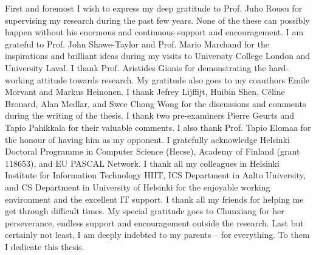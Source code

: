 

\begin{preface}[Espoo]

%
First and foremost I wish to express my deep gratitude to Prof. Juho Rousu for supervising my research during the past few years.
None of the these can possibly happen without his enormous and continuous support and encouragement.
%
I am grateful to Prof. John Shawe-Taylor and Prof. Mario Marchand for the inspirations and brilliant ideas during my visits to University College London and University Laval.
%
I thank Prof. Aristides Gionis for demonstrating the hard-working attitude towards research.
My gratitude also goes to my coauthors Emile Morvant and Markus Heinonen. 
%
I thank Jefrey Lijffijt, Huibin Shen, C\'eline Brouard, Alan Medlar, and Swee Chong Wong for the discussions and comments during the writing of the thesis.
I thank two pre-examiners Pierre Geurts and Tapio Pahikkala for their valuable comments.
I also thank Prof. Tapio Elomaa for the honour of having him as my opponent.
%
I gratefully acknowledge Helsinki Doctoral Programme in Computer Science (Hecse), Academy of Finland (grant 118653), and EU PASCAL Network.
% 
I thank all my colleagues in Helsinki Institute for Information Technology HIIT, ICS Department in Aalto University, and CS Department in University of Helsinki for the enjoyable working environment and the excellent IT support.
%
I thank all my friends for helping me get through difficult times.
%
My special gratitude goes to Chunxiang for her perseverance, endless support and encouragement outside the research.
Last but certainly not least, I am deeply indebted to my parents -- for everything. To them I dedicate this thesis.


\end{preface}
